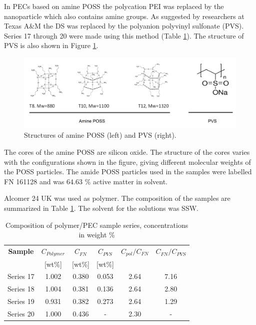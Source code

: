  In PECs based on amine POSS the polycation PEI was replaced by the nanoparticle which also contains amine groups. As suggested by researchers at Texas A\&M the DS was replaced by the polyanion polyvinyl sulfonate (PVS). Series 17 through 20 were made using this method (Table \ref{tab:polyPecComp}). The structure of PVS is also shown in Figure \ref{fig:pvs}.

\begin{figure}[h]
    \centering
    \includegraphics[width=\textwidth]{img/fig/pvs.png}
    \caption{Structures of amine POSS (left) and PVS (right).}
    \label{fig:pvs}
\end{figure}

The cores of the amine POSS are silicon oxide. The structure of the cores varies with the configurations shown in the figure, giving different molecular weights of the POSS particles. The amide POSS particles used in the samples were labelled FN 161128 and was 64.63 \% active matter in solvent.

Alcomer 24 UK was used as polymer. The composition of the samples are summarized in Table \ref{tab:polyPecComp}. The solvent for the solutions was SSW.

\begin{table} 

\centering
\caption{Composition of polymer/PEC sample series, concentrations in weight \%}
\label{tab:polyPecComp}
\begin{tabular}{c c c c c c } 
\toprule
\textbf{Sample} & \textbf{$C_{Polymer}$} & \textbf{$C_{FN}$} & \textbf{$C_{PVS}$} & \textbf{$C_{pol}/C_{FN}$} & \textbf{$C_{FN}/C_{PVS}$} \\ 
&[wt\%]& [wt\%] & [wt\%] && \\
\midrule 
Series 17   & 1.002   & 0.380 & 0.053 & 2.64 & 7.16\\
Series 18   & 1.004   & 0.381 & 0.136 & 2.64 & 2.80\\ 
Series 19   & 0.931   & 0.382 & 0.273 & 2.64 & 1.29\\ 
Series 20   & 1.000   & 0.436 & - & 2.30     & - \\
\bottomrule
\end{tabular}
\end{table}

